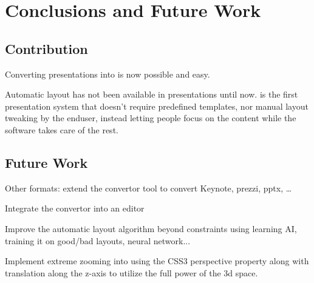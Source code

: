 
 \chapter{Conclusions and Future Work}


  \section{Contribution}


   Converting \ppt presentations into \mxp is now possible and easy.

   Automatic layout has not been available in presentations until now. \mxp is
   the first presentation system that doesn't require predefined templates, nor
   manual layout tweaking by the enduser, instead letting people focus on the
   content while the software takes care of the rest.

  \section{Future Work}


   Other formats: extend the convertor tool to convert Keynote, prezzi, pptx,
   \ldots

   Integrate the convertor into an \mxp editor

   Improve the automatic layout algorithm beyond constraints using learning AI,
   training it on good/bad layouts, neural network...

   Implement extreme zooming into \mxp using the CSS3 perspective property
   along with translation along the z-axis to utilize the full power of the 3d
   space.

